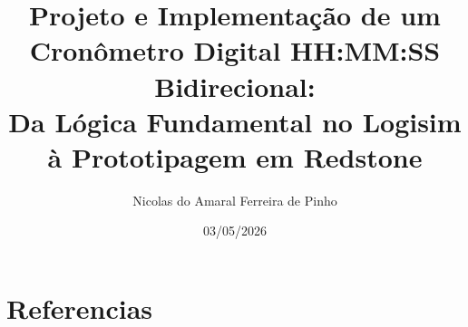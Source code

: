 \documentclass[a4paper,12pt]{article}
\title{Projeto e Implementação de um Cronômetro Digital HH:MM:SS Bidirecional:\\
Da Lógica Fundamental no Logisim à Prototipagem em Redstone}
\author{Nicolas do Amaral Ferreira de Pinho}
\date{03/05/2026}
\begin{document}
\maketitle
\newpage
\tableofcontents


\newpage

\newpage

\newpage

\newpage

\newpage

\newpage

\newpage

\newpage

\newpage

\section{Referencias}

%
\printbibliography
\end{document}
